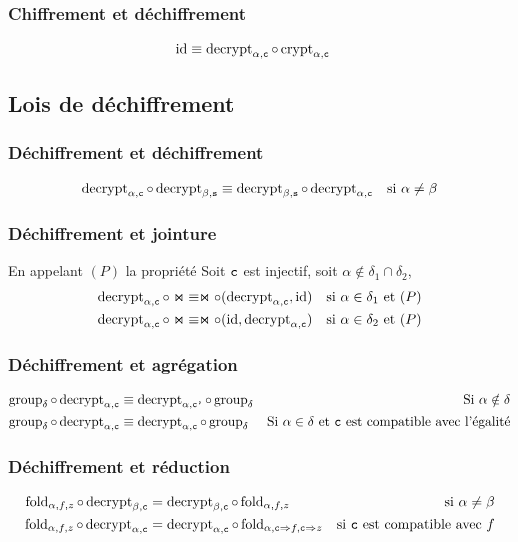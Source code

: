 \subsubsection*{Chiffrement et déchiffrement}
\begin{align*}
\id & \equiv \decryptArgs{\alpha}{c} \circ \cryptArgs{\alpha}{c}
\end{align*}

\subsection*{Lois de déchiffrement}
\subsubsection*{Déchiffrement et déchiffrement}
\begin{align*}
\decryptCAlpha \circ \decryptArgs{\beta}{s}
& \equiv \decryptArgs{\beta}{s} \circ \decryptCAlpha
& \text{si $\alpha \neq \beta$}
\end{align*}

\subsubsection*{Déchiffrement et jointure}
\args

En appelant $(P)$ la propriété
\og Soit $\ch$ est injectif, soit $\alpha \notin \delta_1 \cap \delta_2$\fg{},
\begin{align*}
\decryptCAlpha \circ \Join
& \equiv
\Join \circ (\decryptCAlpha, \id)
& \text{si $\alpha \in \delta_1$ et $(P)$} \\
\decryptCAlpha \circ \Join
& \equiv
\Join \circ (\id, \decryptCAlpha)
& \text{si $\alpha \in \delta_2$ et $(P)$} 
\end{align*}

\subsubsection*{Déchiffrement et agrégation}
\begin{align*}
\groupDelta \circ \decryptCAlpha
& \equiv \decryptArgs{\alpha}{\chp} \circ \groupDelta
& \text{Si $\alpha \notin \delta$} \\
\groupDelta \circ \decryptCAlpha
& \equiv \decryptCAlpha \circ \groupDelta
& \text{Si $\alpha \in \delta$ et $\ch$ est compatible avec l'égalité}
\end{align*}

\subsubsection*{Déchiffrement et réduction}
\args
\begin{align*}
\foldAlphafz \circ \decryptArgs{\beta}{c}
& = \decryptArgs{\beta}{c} \circ \foldAlphafz
& \text{si $\alpha \neq \beta$} \\
\foldAlphafz \circ \decryptCAlpha
& = \decryptCAlpha \circ \fold{\alpha}{\typeT{c} \Rightarrow f}{\typeT{c} \Rightarrow z}
& \text{si $\typeT{c}$ est compatible avec $f$}
\end{align*}

